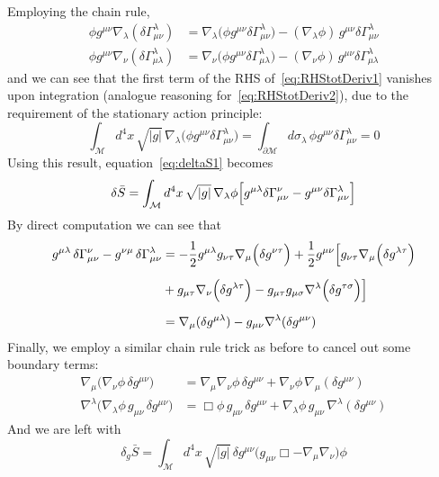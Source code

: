 Employing the chain rule,
\begin{align}
    \phi g^{\mu\nu}\nabla_{\lambda}(\delta\Gamma^{\lambda}_{\mu\nu})
  &= \nabla_{\lambda}\!\bigl(\phi g^{\mu\nu}\delta\Gamma^{\lambda}_{\mu\nu}\bigr)
   -   (\nabla_{\lambda}\phi)\,g^{\mu\nu}\delta\Gamma^{\lambda}_{\mu\nu} \label{eq:RHStotDeriv1}\\[6pt]
 \phi g^{\mu\nu}\nabla_{\nu}(\delta\Gamma^{\lambda}_{\mu\lambda})
  &= \nabla_{\nu}\!\bigl(\phi g^{\mu\nu}\delta\Gamma^{\lambda}_{\mu\lambda}\bigr)-(\nabla_{\nu}\phi)\,g^{\mu\nu}\delta\Gamma^{\lambda}_{\mu\lambda} \label{eq:RHStotDeriv2}
\end{align}
and we can see that the first term of the RHS of~\eqref{eq:RHStotDeriv1} vanishes upon integration (analogue reasoning for~\eqref{eq:RHStotDeriv2}), due
to the requirement of the stationary action principle:
\begin{equation}
    \int_{\mathcal{M}} d^{4}x \,\sqrt{|g|}\,
\nabla_{\lambda}\!\bigl(\phi g^{\mu\nu}\delta\Gamma^{\lambda}_{\mu\nu}\bigr)
  = \int_{\partial\mathcal{M}} d\sigma_{\lambda}\,\phi g^{\mu\nu}
     \delta\Gamma^{\lambda}_{\mu\nu} = 0
\end{equation}    
Using this result, equation~\eqref{eq:deltaS1} becomes
\begin{equation}
    \delta \bar{S} = \int_{\mathcal{M}} d^{4}x \,\sqrt{|g|}\,\nabla_\lambda\phi
    \Bigl[ g^{\mu\lambda}\delta\Gamma^{\nu}_{\mu\nu}
          - g^{\mu\nu}\delta\Gamma^{\lambda}_{\mu\nu}\Bigr]
\end{equation}
By direct computation we can see that
\begin{align}
    g^{\mu\lambda}\,\delta\Gamma^{\nu}_{\mu\nu}
            - g^{\nu\mu}\,\delta\Gamma^{\lambda}_{\mu\nu}
      &= -\frac{1}{2} g^{\mu\lambda}g_{\nu\tau}\nabla_\mu \Bigl(\delta g^{\nu\tau}\Bigr) + \frac{1}{2} g^{\mu\nu}\Bigl[g_{\nu\tau}     
        \nabla_\mu \Bigl(\delta g^{\lambda\tau}\Bigr) \nonumber\\[6pt] 
        &+ g_{\mu\tau} \nabla_\nu \Bigl(\delta g^{\lambda\tau}\Bigr) -  g_{\mu\tau} g_{\mu\sigma} \nabla^\lambda \Bigl(\delta g^{\tau\sigma}\Bigr) \Bigr] \nonumber\\[6pt]
      &= \nabla_\mu(\delta g^{\mu\lambda})
            - g_{\mu\nu}\nabla^\lambda(\delta g^{\mu\nu})
\end{align}
Finally, we employ a similar chain rule trick as before to cancel out some boundary terms:
\begin{align}
    \nabla_\mu\bigl(\nabla_\nu\phi\,\delta g^{\mu\nu}\bigr)
      &= \nabla_\mu\nabla_\nu\phi\,\delta g^{\mu\nu}
         + \nabla_\nu\phi\,\nabla_\mu(\delta g^{\mu\nu}) \\[4pt]
    \nabla^\lambda\bigl(\nabla_\lambda\phi\,g_{\mu\nu}\,\delta g^{\mu\nu}\bigr)
      &= \Box\phi\,g_{\mu\nu}\,\delta g^{\mu\nu}
         + \nabla_\lambda\phi\,g_{\mu\nu}\,\nabla^\lambda(\delta g^{\mu\nu})
    \end{align}
And we are left with 
\begin{equation}
    \delta_g\bar{S} = \int_{\mathcal{M}}\! d^{4}x\,\sqrt{|g|}\,
         \delta g^{\mu\nu}\bigl(g_{\mu\nu}\Box - \nabla_\mu\nabla_\nu\bigr)\phi
\end{equation}

